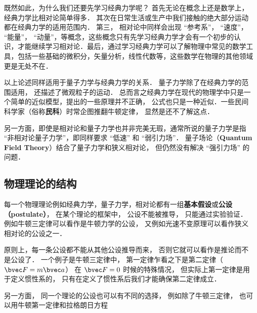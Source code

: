 既然如此，为什么我们还要先学习经典力学呢？ 首先无论在概念上还是数学上，经典力学比相对论简单得多． 其次在日常生活或生产中我们接触的绝大部分运动都在经典力学的适用范围内． 第三， 相对论中同样会出现 “参考系”， “速度”， “能量”， “动量”，等概念，这些概念只有先学习经典力学才会有一个初步的认识，才能继续学习相对论．最后，通过学习经典力学可以了解物理中常见的数学工具，包括一些基础的微积分，矢量分析，线性代数等，这些数学在物理的其他领域更是无处不在．

以上论述同样适用于量子力学与经典力学的关系． 量子力学除了在经典力学的范围适用， 还描述了微观粒子的运动． 总而言之经典力学在现代的物理学中只是一个简单的近似模型，提出的一些原理并不正确， 公式也只是一种近似．一些民间科学家（俗称\textbf{民科}）时常企图推翻牛顿定律， 显然是还不了解这点．

另一方面，即使是相对论和量子力学也并非完美无瑕，通常所说的量子力学是指 “非相对论量子力学”，即同样要求 “低速” 和 “弱引力场”． 量子场论（\textbf{Quantum Field Theory}）结合了量子力学和狭义相对论， 但仍然没有解决 “强引力场” 的问题．

\subsection{物理理论的结构}
每一个物理理论例如经典力学，量子力学，相对论都有一组\textbf{基本假设}或\textbf{公设（postulate）}， 在某个理论的框架中， 公设不能被推导， 只能通过实验验证． 例如牛顿三定律可以看作是牛顿力学的公设， 又例如光速不变原理可以看作狭义相对论的公设之一．

原则上，每一条公设都不能从其他公设推导而来， 否则它就可以看作是推论而不是公设了． 一个例子是牛顿三定律中， 第一定律乍看之下是第二定律（$\bvec F = m\bvec a$） 在 $\bvec F = 0$ 时候的特殊情况， 但实际上第一定律是用于定义惯性系的， 只有在定义了惯性系后我们才能确保第二定律成立．

另一方面， 同一个理论的公设也可以有不同的选择， 例如除了牛顿三定律， 也可以用牛顿第一定律和拉格朗日方程
